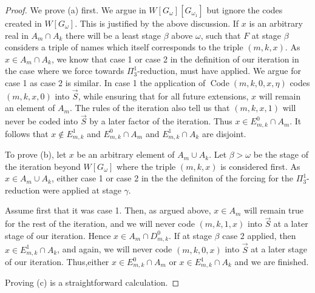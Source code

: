 \documentclass[a4paper,11pt]{article}
\begin{document}
\begin{proof}

We prove (a) first. We argue in $W[G_{\omega}][G_{\omega_1}]$ but ignore the codes created in $W[G_{\omega}]$. This is justified by the above discussion. If $x$ is an arbitrary real in $A_m \cap A_k$ there will be a least stage $\beta$ above $\omega$, such that $F$ at stage $\beta$ considers a triple of names which itself corresponds to the triple  $(m,k,x)$. As $x \in A_m \cap A_k$, we know that case 1 or case 2  in the definition of our iteration in the case where we force towards $\Pi^1_3$-reduction, must have applied. We argue for case 1 as case 2 is similar. In case 1  the application of $\operatorname{Code} {(m,k,0,x,\eta)}$ codes $(m,k,x,0)$ into $\vec{S}$, while ensuring that for all future  extensions, $x $ will remain an element of $A_m$.  The rules of the iteration also tell us that $(m,k,x,1)$ will never be coded into $\vec{S}$ by a later factor of the iteration. Thus $x \in E^0_{m,k} \cap A_m$. It follows that $x \notin E^1_{m,k}$ and $E^0_{m,k} \cap A_m$ and $E^1_{m,k} \cap A_k$ are disjoint.


To prove (b), let $x$ be an arbitrary element of $A_m \cup A_k$. Let $\beta> \omega$ be the stage of the iteration beyond $W[G_{\omega}]$ where the triple $(m,k,x)$ is considered first. As $x \in A_m \cup A_k$, either case 1 or case 2 in the the definiton of the forcing for the $\Pi^1_3$-reduction were applied at stage $\gamma$.

Assume first that it was case 1. Then, as argued above, $x \in  A_m$ will remain true for the rest of the iteration,  and we will never code $(m,k,1,x)$ into $\vec{S}$ at a later stage of our iteration. Hence $x \in A_m \cap D^0_{m,k}$. If at stage $\beta$ case 2 applied, then $x \in E^1_{m,k} \cap A_k$, and again, we will never code $(m,k,0,x)$ into $\vec{S}$ at a later stage of our iteration. Thus,either $x \in E^0_{m,k} \cap A_m$ or $x \in E^1_{m,k} \cap A_k$ and we are finished.


Proving (c) is a straightforward calculation.

\end{proof}
\end{document}
